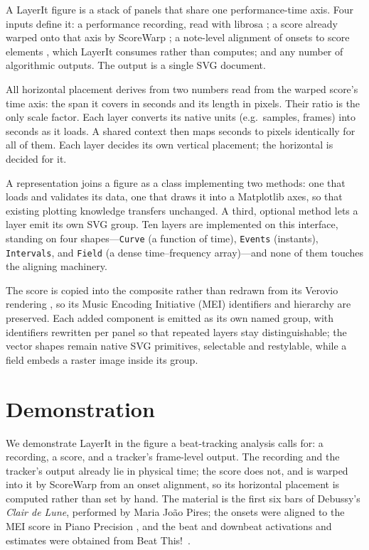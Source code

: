 \documentclass{article}
\begin{document}
A LayerIt figure is a stack of panels that share one performance-time axis.
Four inputs define it: a performance recording, read with librosa \cite{mcfee2015LibrosaAudioMusic}; a score already warped onto that axis by ScoreWarp \cite{goebl2025LetsScoreWarpAgain}; a note-level alignment of onsets to score elements \cite{weigl2020MultimodalMusicInformation}, which LayerIt consumes rather than computes; and any number of algorithmic outputs.
The output is a single SVG document.

All horizontal placement derives from two numbers read from the warped score's time axis: the span it covers in seconds and its length in pixels.
Their ratio is the only scale factor.
Each layer converts its native units (e.g.\ samples, frames) into seconds as it loads.
A shared context then maps seconds to pixels identically for all of them.
Each layer decides its own vertical placement; the horizontal is decided for it.

A representation joins a figure as a class implementing two methods: one that loads and validates its data, one that draws it into a Matplotlib \cite{hunter2007Matplotlib2DGraphics} axes, so that existing plotting knowledge transfers unchanged.
A third, optional method lets a layer emit its own SVG group.
Ten layers are implemented on this interface, standing on four shapes---\texttt{Curve} (a function of time), \texttt{Events} (instants), \texttt{Intervals}, and \texttt{Field} (a dense time--frequency array)---and none of them touches the aligning machinery.

The score is copied into the composite rather than redrawn from its Verovio rendering \cite{pugin2014VerovioLibraryEngraving}, so its Music Encoding Initiative (MEI) identifiers and hierarchy are preserved.
Each added component is emitted as its own named group, with identifiers rewritten per panel so that repeated layers stay distinguishable; the vector shapes remain native SVG primitives, selectable and restylable, while a field embeds a raster image inside its group.

\section{Demonstration}\label{sec:demonstration}

We demonstrate LayerIt in the figure a beat-tracking analysis calls for: a
recording, a score, and a tracker's frame-level output. The recording and the tracker's output already lie in physical time; the score does not, and is warped into it by ScoreWarp from an onset alignment, so its horizontal placement is computed rather than set by hand. The material is the first six bars of Debussy's \emph{Clair de Lune}, performed by Maria João Pires; the onsets were aligned to the MEI score in Piano Precision \cite{jiang2025PianoPrecisionAdvancing}, and the beat and downbeat activations and estimates were obtained from Beat This!~\cite{foscarin2024BeatThisAccurate}.
\end{document}
